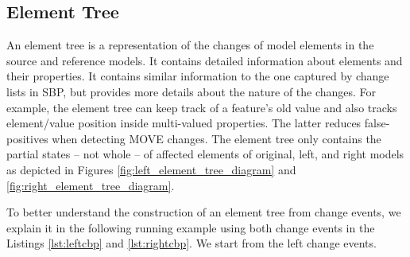 \documentclass{jot}
\begin{document}
\subsection{Element Tree}
\label{sec:tree_construction}
An element tree is a representation of the changes of model elements in the source and reference models.
It contains detailed information about elements and their properties.
It contains similar information to the one captured by change lists in SBP, but provides more details about the nature of the changes.
For example, the element tree can keep track of a feature's old value and also tracks element/value position inside multi-valued properties. The latter reduces false-positives when detecting MOVE changes. 
The element tree only contains the partial states -- not whole -- of affected elements of original, left, and right models as depicted in Figures \ref{fig:left_element_tree_diagram} and \ref{fig:right_element_tree_diagram}.

To better understand the construction of an element tree from change events, we explain it in the following running example using both change events in the Listings \ref{lst:leftcbp} and \ref{lst:rightcbp}. We start from the left change events. 
\end{document}
